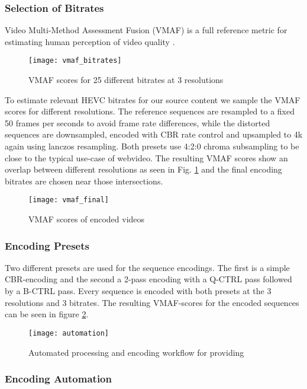 \subsubsection{Selection of Bitrates}
Video Multi-Method Assessment Fusion (VMAF) is a full reference metric for estimating human perception of video quality \cite{lin2014:fvqa}.

\begin{figure}[!t]
	\centering
	\texttt{[image: vmaf\_bitrates]}
	\caption{VMAF scores for 25 different bitrates at 3 resolutions}
	\label{fig:vmaf:bitrates}
\end{figure}

To estimate relevant HEVC bitrates for our source content we sample the VMAF scores for different resolutions. The reference sequences are resampled to a fixed 50 frames per seconds to avoid frame rate differences, while the distorted sequences are downsampled, encoded with CBR rate control and upsampled to 4k again using lanczos resampling. Both presets use 4:2:0 chroma subsampling to be close to the typical use-case of webvideo. The resulting VMAF scores show an overlap between different resolutions as seen in Fig. \ref{fig:vmaf:bitrates} and the final encoding bitrates are chosen near those intersections.

\begin{figure}[!t]
	\centering
	\texttt{[image: vmaf\_final]}
	\caption{VMAF scores of encoded videos}
	\label{fig:vmaf:encoded}
\end{figure}

\subsubsection{Encoding Presets}
Two different presets are used for the sequence encodings. The first is a simple CBR-encoding and the second a 2-pass encoding with a Q-CTRL pass followed by a B-CTRL pass. Every sequence is encoded with both presets at the 3 resolutions and 3 bitrates. The resulting VMAF-scores for the encoded sequences can be seen in figure \ref{fig:vmaf:encoded}.

\begin{figure}[!t]
	\centering
	\texttt{[image: automation]}
	\caption{Automated processing and encoding workflow for providing }
	\label{fig:automation}
\end{figure}


\subsubsection{Encoding Automation}
